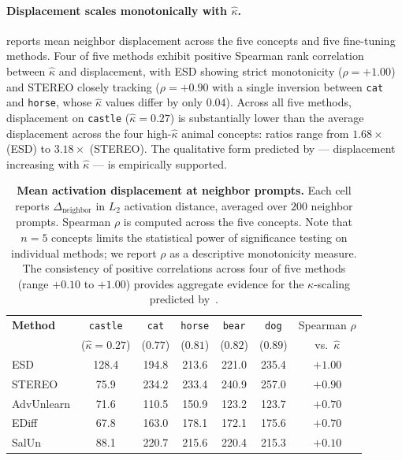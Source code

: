 \paragraph{Displacement scales monotonically with $\hat\kappa$.}
 reports mean neighbor displacement across the five concepts and five fine-tuning methods. Four of five methods exhibit positive Spearman rank correlation between $\hat\kappa$ and displacement, with ESD showing strict monotonicity ($\rho = +1.00$) and STEREO closely tracking ($\rho = +0.90$ with a single inversion between \texttt{cat} and \texttt{horse}, whose $\hat\kappa$ values differ by only $0.04$). Across all five methods, displacement on \texttt{castle} ($\hat\kappa = 0.27$) is substantially lower than the average displacement across the four high-$\hat\kappa$ animal concepts: ratios range from $1.68\times$ (ESD) to $3.18\times$ (STEREO). The qualitative form predicted by  --- displacement increasing with $\hat\kappa$ --- is empirically supported.

\begin{table}[h]
\centering
\small
\setlength{\tabcolsep}{6pt}
\begin{tabular}{lccccc|c}
\toprule
\textbf{Method} & \texttt{castle} & \texttt{cat} & \texttt{horse} & \texttt{bear} & \texttt{dog} & Spearman $\rho$ \\
& ($\hat\kappa{=}0.27$) & ($0.77$) & ($0.81$) & ($0.82$) & ($0.89$) & vs.\ $\hat\kappa$ \\
\midrule
ESD        & 128.4 & 194.8 & 213.6 & 221.0 & 235.4 & $+1.00$ \\
STEREO     & \phantom{0}75.9 & 234.2 & 233.4 & 240.9 & 257.0 & $+0.90$ \\
AdvUnlearn & \phantom{0}71.6 & 110.5 & 150.9 & 123.2 & 123.7 & $+0.70$ \\
EDiff      & \phantom{0}67.8 & 163.0 & 178.1 & 172.1 & 175.6 & $+0.70$ \\
SalUn      & \phantom{0}88.1 & 220.7 & 215.6 & 220.4 & 215.3 & $+0.10$ \\
\bottomrule
\end{tabular}
\caption{\textbf{Mean activation displacement at neighbor prompts.} Each cell reports $\Delta_{\text{neighbor}}$ in $L_2$ activation distance, averaged over $200$ neighbor prompts. Spearman $\rho$ is computed across the five concepts. Note that $n = 5$ concepts limits the statistical power of significance testing on individual methods; we report $\rho$ as a descriptive monotonicity measure. The consistency of positive correlations across four of five methods (range $+0.10$ to $+1.00$) provides aggregate evidence for the $\kappa$-scaling predicted by~.}
\label{tab:displacement}
\end{table}

